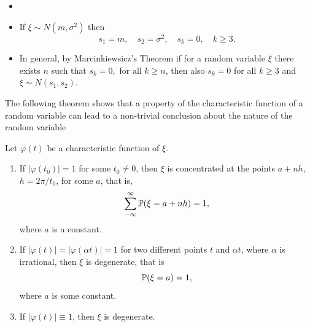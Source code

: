 \begin{remark}
\begin{itemize}
    \item[]
    \item If $\xi \sim N(m, \sigma^2)$ then
    \begin{equation*}
        s_1 = m, \quad s_2 = \sigma^2, \quad s_k = 0, \quad k\ge3.
    \end{equation*}
    \item In general, by Marcinkiewsicz's Theorem if for a random variable $\xi$ there exists $n$ such that $s_k = 0,$ for all $k \ge n$, then also $s_k = 0$ for all $k \ge 3$ and $\xi \sim N(s_1, s_2)$.
\end{itemize}
\end{remark}
The following theorem shows that a property of the characteristic function of a random variable can lead to a non-trivial conclusion about the nature of the random variable
\begin{theorem}
Let $\varphi(t)$ be a characteristic function of $\xi$.
\begin{enumerate}
    \item If $|\varphi(t_0)| = 1$ for some $t_0 \ne 0$, then $\xi$ is concentrated at the points $a + nh$, $h = 2\pi/t_0$, for some $a$, that is,
    \begin{equation*}
        \sum_{-\infty}^\infty \mathbb{P}(\xi = a + n h) = 1,
    \end{equation*}
    where $a$ is a constant.
    \item If $|\varphi(t)| = |\varphi(\alpha t)| = 1$ for two different points $t$ and $\alpha t$, where $\alpha$ is irrational, then $\xi$ is degenerate, that is 
    \begin{equation*}
        \mathbb{P}(\xi = a) = 1,
    \end{equation*}
    where $a$ is some constant.
    \item If $|\varphi(t)|\equiv 1$, then $\xi$ is degenerate.
\end{enumerate}
\end{theorem}
